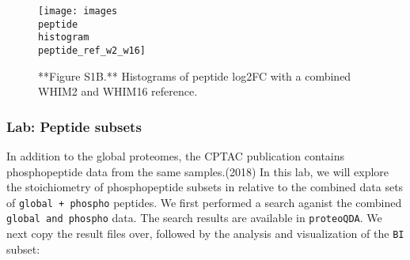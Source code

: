 \documentclass[]{article}
\begin{document}
\begin{figure}

{\centering \texttt{[image: images\\peptide\\histogram\\peptide\_ref\_w2\_w16]} 

}

\caption{**Figure S1B.** Histograms of peptide log2FC with a combined WHIM2 and WHIM16 reference.}\label{fig:Peptide_reference_effect_2}
\end{figure}

\hypertarget{lab-peptide-subsets}{%
\subsubsection{Lab: Peptide subsets}\label{lab-peptide-subsets}}

In addition to the global proteomes, the CPTAC publication contains
phosphopeptide data from the same samples.(2018) In this lab, we will
explore the stoichiometry of phosphopeptide subsets in relative to the
combined data sets of \texttt{global\ +\ phospho} peptides. We first
performed a search aganist the combined \texttt{global\ and\ phospho}
data. The search results are available in \texttt{proteoQDA}. We next
copy the result files over, followed by the analysis and visualization
of the \texttt{BI} subset:
\end{document}
